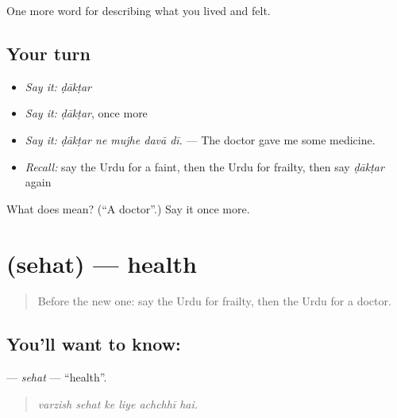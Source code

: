 \begin{grammarlens}[title={What you've built}]
One more word for describing what you lived and felt.
\end{grammarlens}

\subsection*{Your turn}
\begin{itemize}
\raggedright
  \item \emph{Say it:} \emph{ḍākṭar}
  \item \emph{Say it:} \emph{ḍākṭar}, once more
  \item \emph{Say it:} \emph{ḍākṭar ne mujhe davā dī.} — The doctor gave me some medicine.
  \item \emph{Recall:} say the Urdu for a faint, then the Urdu for frailty, then say \emph{ḍākṭar} again
\end{itemize}

\begin{tcolorbox}[breakable,colback=teal!4,colframe=teal!35!black,title={Before you move on}]
What does  mean? (\textquotedblleft{}A doctor\textquotedblright{}.) Say it once more.
\end{tcolorbox}
\section[\texorpdfstring{\ur{صحت} (sehat)}{صحت (sehat)}]{ (sehat) — health}

\label{lesson:UR-C471-sehat}



\begin{quote}
Before the new one: say the Urdu for frailty, then the Urdu for a doctor.
\end{quote}

\subsection*{You'll want to know: }
\textbf{} — \emph{sehat} — \textquotedblleft{}health\textquotedblright{}.

\begin{quote}
     
\end{quote}

\begin{quote}
\emph{varzish sehat ke liye achchhī hai.}
\end{quote}

